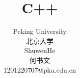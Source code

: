 \documentclass[12pt,twiside,a4paper]{ctexbook}
\numberwithin{chapter}{part}
\begin{document}

\author
{
Peking University\\
北京大学\\
ShuwenHe\\
何书文\\
1201220707@pku.edu.cn
}


\title{C++}
\maketitle
\tableofcontents %
\newpage
\pagestyle{fancy}
\end{document}
